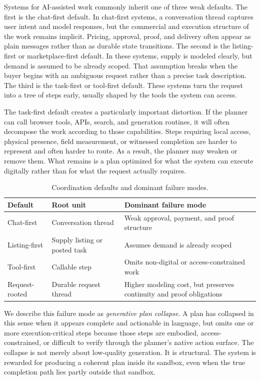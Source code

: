 Systems for AI-assisted work commonly inherit one of three weak defaults. The first is the chat-first default. In chat-first systems, a conversation thread captures user intent and model responses, but the commercial and execution structure of the work remains implicit. Pricing, approval, proof, and delivery often appear as plain messages rather than as durable state transitions. The second is the listing-first or marketplace-first default. In these systems, supply is modeled clearly, but demand is assumed to be already scoped. That assumption breaks when the buyer begins with an ambiguous request rather than a precise task description. The third is the task-first or tool-first default. These systems turn the request into a tree of steps early, usually shaped by the tools the system can access.

The task-first default creates a particularly important distortion. If the planner can call browser tools, APIs, search, and generation routines, it will often decompose the work according to those capabilities. Steps requiring local access, physical presence, field measurement, or witnessed completion are harder to represent and often harder to route. As a result, the planner may weaken or remove them. What remains is a plan optimized for what the system can execute digitally rather than for what the request actually requires.

\begin{table}[t]
\caption{Coordination defaults and dominant failure modes.}
\label{tab:coordination-defaults}
\centering
\footnotesize
\begin{tabularx}{\columnwidth}{p{1.45cm}p{1.75cm}X}
\toprule
Default & Root unit & Dominant failure mode \\
\midrule
Chat-first & Conversation thread & Weak approval, payment, and proof structure \\
Listing-first & Supply listing or posted task & Assumes demand is already scoped \\
Tool-first & Callable step & Omits non-digital or access-constrained work \\
Request-rooted & Durable request thread & Higher modeling cost, but preserves continuity and proof obligations \\
\bottomrule
\end{tabularx}
\end{table}

We describe this failure mode as \emph{generative plan collapse}. A plan has collapsed in this sense when it appears complete and actionable in language, but omits one or more execution-critical steps because those steps are embodied, access-constrained, or difficult to verify through the planner's native action surface. The collapse is not merely about low-quality generation. It is structural. The system is rewarded for producing a coherent plan inside its sandbox, even when the true completion path lies partly outside that sandbox.

